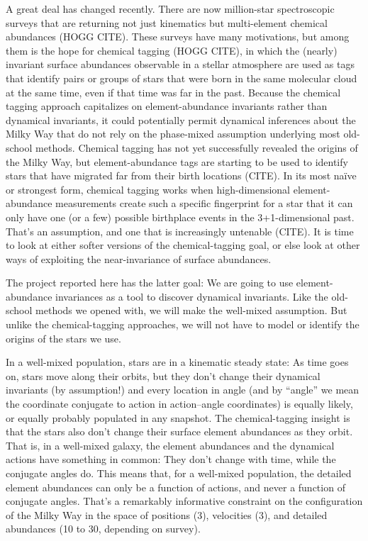 \documentclass[modern]{aastex62}
\begin{document}
A great deal has changed recently.
There are now million-star spectroscopic surveys that are returning not
just kinematics but multi-element chemical abundances (HOGG CITE).
These surveys have many motivations, but among them is the hope for
chemical tagging (HOGG CITE), in which the (nearly) invariant surface
abundances observable in a stellar atmosphere are used as tags that identify
pairs or groups of stars that were born in the same molecular cloud at the same time,
even if that time was far in the past.
Because the chemical tagging approach capitalizes on element-abundance invariants
rather than dynamical invariants, it could potentially permit dynamical inferences
about the Milky Way that do not rely on the phase-mixed assumption underlying
most old-school methods.
Chemical tagging has not yet successfully revealed the origins of
the Milky Way, but element-abundance tags are starting to be used to identify stars that have
migrated far from their birth locations (CITE).
In its most na\"ive or strongest form, chemical tagging works when high-dimensional
element-abundance measurements create such a specific fingerprint for a star that it
can only have one (or a few) possible birthplace events in the 3+1-dimensional past.
That's an assumption, and one that is increasingly untenable (CITE).
It is time to look at either softer versions of the chemical-tagging goal, or else
look at other ways of exploiting the near-invariance of surface abundances.

The project reported here has the latter goal:
We are going to use element-abundance invariances as a tool to discover dynamical
invariants.
Like the old-school methods we opened with, we will make the well-mixed assumption.
But unlike the chemical-tagging approaches, we will not have to model or identify
the origins of the stars we use.

In a well-mixed population, stars are in a kinematic steady state:
As time goes on, stars move along their orbits, but they don't change their dynamical
invariants (by assumption!) and every location in angle (and by ``angle'' we mean the
coordinate conjugate to action in action--angle coordinates) is equally likely, or
equally probably populated in any snapshot.
The chemical-tagging insight is that the stars also don't change their surface element
abundances as they orbit.
That is, in a well-mixed galaxy, the element abundances and the dynamical actions have
something in common:
They don't change with time, while the conjugate angles do.
This means that, for a well-mixed population, the detailed element abundances can only
be a function of actions, and never a function of conjugate angles.
That's a remarkably informative constraint on the configuration of the Milky Way in
the space of positions (3), velocities (3), and detailed abundances (10 to 30, depending
on survey).
\end{document}
